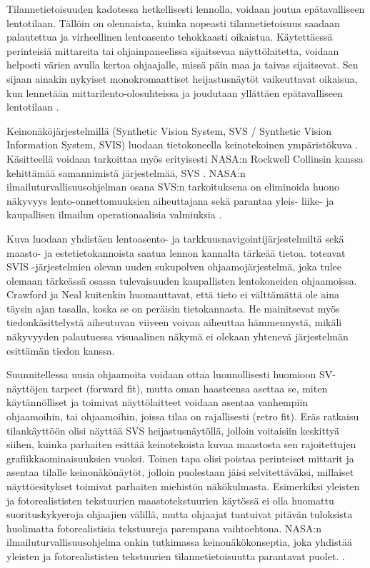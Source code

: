 \documentclass[utf8,bachelor,manualbib]{gradu3}
\begin{document}
Tilannetietoisuuden kadotessa hetkellisesti lennolla, voidaan joutua epätavalliseen lentotilaan. Tällöin on olennaista, kuinka nopeasti tilannetietoisuus saadaan palautettua ja virheellinen lentoasento tehokkaasti oikaistua. Käytettäessä perinteisiä mittareita tai ohjainpaneelissa sijaitsevaa näyttölaitetta, voidaan helposti värien avulla kertoa ohjaajalle, missä päin maa ja taivas sijaitsevat. Sen sijaan ainakin nykyiset monokromaattiset heijastusnäytöt vaikeuttavat oikaisua, kun lennetään mittarilento-olosuhteissa ja joudutaan yllättäen epätavalliseen lentotilaan \citep{crawfordneal2006}.

Keinonäköjärjestelmillä (Synthetic Vision System, SVS / Synthetic Vision Information System, SVIS) luodaan tietokoneella keinotekoinen ympäristökuva \citep{baileyym2007}. Käsitteellä voidaan tarkoittaa myös erityisesti NASA:n Rockwell Collinsin kanssa kehittämää samannimistä järjestelmää, SVS \citep{crawfordneal2006}. NASA:n ilmailuturvallisuusohjelman osana SVS:n tarkoituksena on eliminoida huono näkyvyys lento-onnettomuuksien aiheuttajana sekä parantaa yleis- liike- ja kaupallisen ilmailun operationaalisia valmiuksia \citeyearpar{prinzel2004}.

Kuva luodaan yhdistäen lentoasento- ja tarkkuusnavigointijärjestelmiltä sekä maasto- ja estetietokannoista saatua lennon kannalta tärkeää tietoa. \cite{schnellym2004} toteavat SVIS -järjestelmien olevan uuden sukupolven ohjaamojärjestelmä, joka tulee olemaan tärkeässä osassa tulevaisuuden kaupallisten lentokoneiden ohjaamoissa. Crawford ja Neal kuitenkin \citeyearpar{crawfordneal2006} huomauttavat, että tieto ei välttämättä ole aina täysin ajan tasalla, koska se on peräisin tietokannasta. He mainitsevat myös tiedonkäsittelystä aiheutuvan viiveen voivan aiheuttaa hämmennystä, mikäli näkyvyyden palautuessa visuaalinen näkymä ei olekaan yhtenevä järjestelmän esittämän tiedon kanssa.

Suunnitellessa uusia ohjaamoita voidaan ottaa luonnollisesti huomioon SV-näyttöjen tarpeet (forward fit), mutta oman haasteensa asettaa se, miten käytännölliset ja toimivat näyttölaitteet voidaan asentaa vanhempiin ohjaamoihin, tai ohjaamoihin, joissa tilaa on rajallisesti (retro fit). Eräs ratkaisu tilankäyttöön olisi näyttää SVS heijastusnäytöllä, jolloin voitaisiin keskittyä siihen, kuinka parhaiten esittää keinotekoista kuvaa maastosta sen rajoitettujen grafiikkaominaisuuksien vuoksi. Toinen tapa olisi poistaa perinteiset mittarit ja asentaa tilalle keinonäkönäytöt, jolloin puolestaan jäisi selvitettäväksi, millaiset näyttöesitykset toimivat parhaiten miehistön näkökulmasta. Esimerkiksi yleisten ja fotorealististen tekstuurien maastotekstuurien käytössä ei olla huomattu suorituskykyeroja ohjaajien välillä, mutta ohjaajat tuntuivat pitävän tuloksista huolimatta fotorealistisia tekstuureja parempana vaihtoehtona. NASA:n ilmailuturvallisuusohjelma onkin tutkimassa keinonäkökonseptia, joka yhdistää yleisten ja fotorealististen tekstuurien tilannetietoisuutta parantavat puolet. \citep{prinzel2004}.
\end{document}

